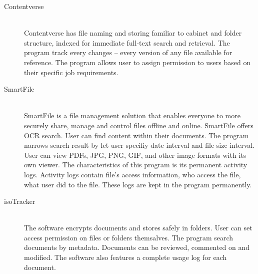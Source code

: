 \begin{description}
\item[Contentverse] \hfill \\
Contentverse has file naming and storing familiar to cabinet and folder structure, indexed for immediate full-text search and retrieval.
The program track every changes -- every version of any file available for reference.
The program allows user to assign permission to users based on their specific job requirements.

\item[SmartFile] \hfill \\
SmartFile is a file management solution that enables everyone to more securely share, manage and control files offline and online.
SmartFile offers \gls{OCR} search.
User can find content within their documents.
The program narrows search result by let user specifiy date interval and file size interval.
User can view PDFs, JPG, PNG, GIF, and other image formats with its own viewer.
The characteristics of this program is its permanent activity logs.
Activity logs contain file's access information, who access the file, what user did to the file.
These logs are kept in the program permanently.

\item[isoTracker] \hfill \\
The software encrypts documents and stores safely in folders.
User can set access permission on files or folders themsalves.
The program search documents by metadata.
Documents can be reviewed, commented on and modified. The software also features a complete usage log for each document.


\end{description}